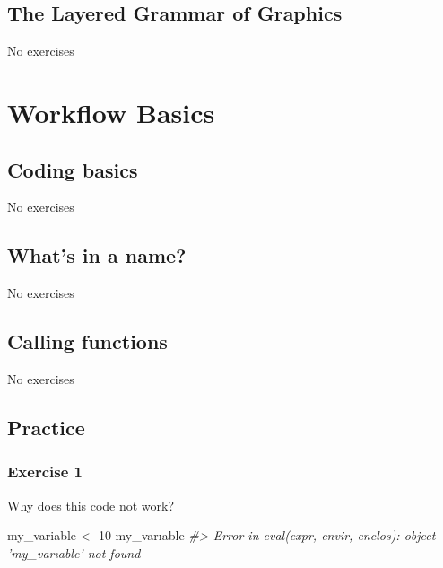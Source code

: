 \documentclass[]{book}
\newenvironment{Shaded}{\begin{snugshade}}{\end{snugshade}}
\newcommand{\CommentTok}[1]{\textcolor[rgb]{0.56,0.35,0.01}{\textit{#1}}}
\newcommand{\DecValTok}[1]{\textcolor[rgb]{0.00,0.00,0.81}{#1}}
\newcommand{\NormalTok}[1]{#1}
\newcommand{\StringTok}[1]{\textcolor[rgb]{0.31,0.60,0.02}{#1}}
\theoremstyle{definition}
\theoremstyle{definition}
\theoremstyle{definition}
\theoremstyle{remark}
\begin{document}
\hypertarget{the-layered-grammar-of-graphics}{%
\section{The Layered Grammar of
Graphics}\label{the-layered-grammar-of-graphics}}

No exercises

\hypertarget{workflow-basics}{%
\chapter{Workflow Basics}\label{workflow-basics}}

\hypertarget{coding-basics}{%
\section{Coding basics}\label{coding-basics}}

No exercises

\hypertarget{whats-in-a-name}{%
\section{What's in a name?}\label{whats-in-a-name}}

No exercises

\hypertarget{calling-functions}{%
\section{Calling functions}\label{calling-functions}}

No exercises

\hypertarget{practice}{%
\section{Practice}\label{practice}}

\hypertarget{exercise-1}{%
\subsection{Exercise 1}\label{exercise-1}}

Why does this code not work?

\begin{Shaded}
\begin{Highlighting}[]
\NormalTok{my_variable <-}\StringTok{ }\DecValTok{10}
\NormalTok{my_varıable}
\CommentTok{#> Error in eval(expr, envir, enclos): object 'my_varıable' not found}
\end{Highlighting}
\end{Shaded}
\end{document}
